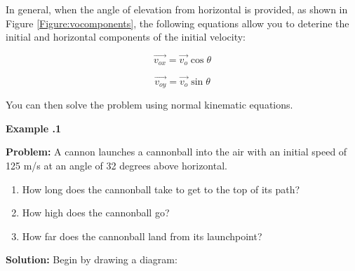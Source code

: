 {	In general, when the angle of elevation from horizontal is provided, as shown in Figure \ref{Figure:vocomponents}, the following equations allow you to deterine the initial and horizontal components of the initial velocity:
	
	\begin{equation}
		\overrightarrow{v_{ox}} = \overrightarrow{v_o} \cos \theta
	\end{equation}
	
		\begin{equation}
		\overrightarrow{v_{oy}} = \overrightarrow{v_o} \sin \theta
	\end{equation}

You can then solve the problem using normal kinematic equations.  

\begin{mdframed}[backgroundcolor=blue!10!white]
	\begin{center}
		
		
		\textbf{Example \thesection.1}	
	\end{center}
	
	\textbf{Problem: } A cannon launches a cannonball into the air with an initial speed of 125 m/s at an angle of 32 degrees above horizontal.  
	\begin{enumerate}
		\item How long does the cannonball take to get to the top of its path?
		\item How high does the cannonball go?
		\item How far does the cannonball land from its launchpoint?
	\end{enumerate}
	\vspace{0.1in}
	
	\textbf{Solution:} 
	Begin by drawing a diagram:
\begin{center}
	
\end{center}
\end{mdframed}}
